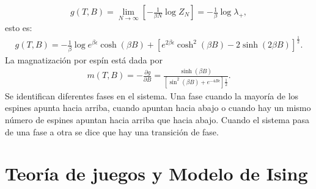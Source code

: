 \documentclass[letterpaper,12pt,oneside]{book}
\begin{document}
%
\begin{eqnarray}
g(T,B)=\lim_{N\to\infty}\left[-\frac{1}{\beta N}\log Z_N\right]=-\frac{1}{\beta}\log\lambda_{+},
\end{eqnarray}
%
esto es:
%
\begin{eqnarray}
g(T,B)=-\frac{1}{\beta}\log{e^{\beta \epsilon} \cosh(\beta B) + \left[e^{2\beta \epsilon } \cosh^2 (\beta B) - 2\sinh (2\beta B)\right]^{\frac{1}{2}}}.
\end{eqnarray}
%
La magnatizaci\'on por esp\'in est\'a dada por 
%
\begin{eqnarray}
m(T,B)=-\frac{\partial g}{\partial B} = \frac{\sinh(\beta B)}{[\sin^2(\beta B)+ e^{-4 B\epsilon}]\frac{1}{2}}.
\end{eqnarray}
%
Se identifican diferentes fases en el sistema. Una fase cuando la mayor\'ia de los espines apunta hacia arriba, cuando apuntan hacia abajo o cuando hay un mismo n\'umero de espines apuntan hacia arriba que hacia abajo. Cuando el sistema pasa de una fase a otra se dice que hay una transici\'on de fase. 

\section{Teor\'ia de juegos y Modelo de Ising}
\end{document}
